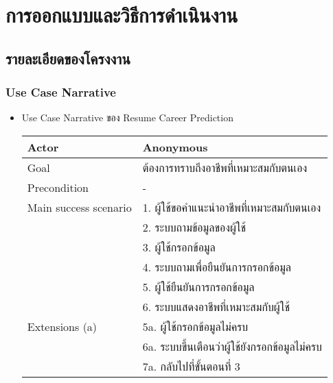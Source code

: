 \chapter{การออกแบบและวิธีการดำเนินงาน}

\section{รายละเอียดของโครงงาน}
\subsection{Use Case Narrative}
\begin{itemize}
    \item Use Case Narrative ของ Resume Career Prediction
          \begin{table}[!h]
              \begin{tabular}{|l|l|} \hline
                  Actor                 & Anonymous                                       \\ \hline
                  Goal                  & ต้องการทราบถึงอาชีพที่เหมาะสมกับตนเอง                 \\ \hline
                  Precondition          & -                                               \\ \hline
                  Main success scenario & 1. ผู้ใช้ขอคำแนะนำอาชีพที่เหมาะสมกับตนเอง                \\
                                        & 2. ระบบถามข้อมูลของผู้ใช้                            \\
                                        & 3. ผู้ใช้กรอกข้อมูล                                  \\
                                        & 4. ระบบถามเพื่อยืนยันการกรอกข้อมูล                    \\
                                        & 5. ผู้ใช้ยืนยันการกรอกข้อมูล                           \\
                                        & 6. ระบบแสดงอาชีพที่เหมาะสมกับผู้ใช้                    \\ \hline
                  Extensions (a)        & 5a. ผู้ใช้กรอกข้อมูลไม่ครบ                            \\
                                        & 6a. ระบบขึ้นเตือนว่าผู้ใช้ยังกรอกข้อมูลไม่ครบ              \\
                                        & 7a. กลับไปที่ขั้นตอนที่ 3                              \\ \hline

\end{tabular}
\end{table}
\end{itemize}
